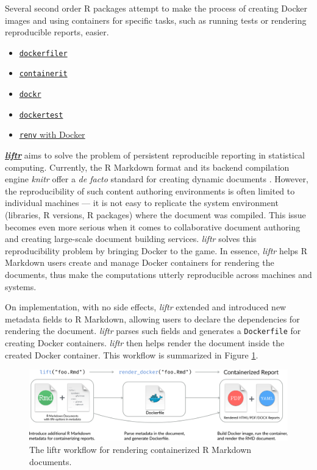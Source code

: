 Several second order R packages attempt to make the process of creating
Docker images and using containers for specific tasks, such as running
tests or rendering reproducible reports, easier.

\begin{itemize}
\tightlist
\item
  \href{https://github.com/ColinFay/dockerfiler/}{\texttt{dockerfiler}}
\item
  \href{https://github.com/o2r-project/containerit/}{\texttt{containerit}}
\item
  \href{https://github.com/smaakage85/dockr}{\texttt{dockr}}
\item
  \href{https://github.com/traitecoevo/dockertest/}{\texttt{dockertest}}
\item
  \href{https://rstudio.github.io/renv/articles/docker.html}{\texttt{renv}
  with Docker}
\end{itemize}

\textbf{\href{https://nanx.me/liftr/}{\emph{liftr}}} \citep{liftr2019}
aims to solve the problem of persistent reproducible reporting in
statistical computing. Currently, the R Markdown format and its backend
compilation engine \emph{knitr} offer a \emph{de facto} standard for
creating dynamic documents \citep{xie2018}. However, the reproducibility
of such content authoring environments is often limited to individual
machines --- it is not easy to replicate the system environment
(libraries, R versions, R packages) where the document was compiled.
This issue becomes even more serious when it comes to collaborative
document authoring and creating large-scale document building services.
\emph{liftr} solves this reproducibility problem by bringing Docker to
the game. In essence, \emph{liftr} helps R Markdown users create and
manage Docker containers for rendering the documents, thus make the
computations utterly reproducible across machines and systems.

On implementation, with no side effects, \emph{liftr} extended and
introduced new metadata fields to R Markdown, allowing users to declare
the dependencies for rendering the document. \emph{liftr} parses such
fields and generates a \texttt{Dockerfile} for creating Docker
containers. \emph{liftr} then helps render the document inside the
created Docker container. This workflow is summarized in Figure
\ref{figure:liftr}.

\begin{figure}[htbp]
  \centering
  \includegraphics[width=\textwidth]{liftr-workflow}
  \caption{The liftr workflow for rendering containerized R Markdown documents.}
  \label{figure:liftr}
\end{figure}

